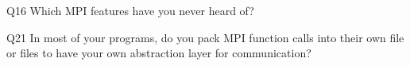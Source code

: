 \begin{description}%
\item{Q16} Which MPI features have you never heard of?%
\item{Q21} In most of your programs, do you pack MPI function calls into their own file or files to have your own abstraction layer for communication?%
\end{description}%
